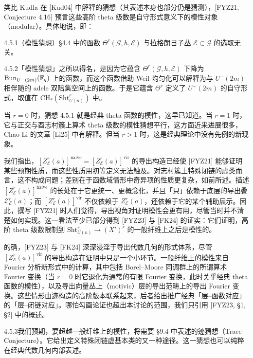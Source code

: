 类比 Kudla 在 [Kud04] 中解释的猜想（其表述本身也部分仍是猜测），[FYZ21, Conjecture 4.16] 预言这些高阶 theta 级数是自守形式意义下的模性对象（modular）。具体地说，即：

\begin{conj}{4.5.1}\label{thm:a6-03-2}（模性猜想）§4.4 中的函数 $\Theta^r(\mathcal G,h,\mathcal E)$ 与拉格朗日子丛 $\mathcal E\subset\mathcal G$ 的选取无关。
\end{conj}

\begin{rem}{4.5.2}\label{thm:a6-03-3}「模性猜想」之所以得名，是因为它蕴含 $\Theta^r(\mathcal G,h,\mathcal E)$ 下降为 $\mathrm{Bun}_{U^-(2m)}(\mathbb{F}_q)$ 上的函数，而这个函数借助 Weil 均匀化可以解释为与 $U^-(2m)$ 相伴随的 adele 双陪集空间上的函数。于是它蕴含 $\Theta^r$ 定义了 $U^-(2m)$ 的自守形式，取值在 $\mathrm{CH}_*(\mathrm{Sht}^r_{U(n)})$ 中。
\end{rem}

当 $r=0$ 时，猜想 4.5.1 就是经典 theta 函数的模性，这早已知道。当 $r=1$ 时，它与正交与酉志村簇上算术 theta 级数的模性猜想平行，这方面近来进展很多，Chao Li 的文章 [Li25] 中有解释。但当 $r>1$ 时，这是经典理论中没有先例的新现象。

我们指出，$[Z^r_{\mathcal E}(a)]^{\mathrm{naive}}=[Z^r_{\mathcal E}(a)]^{\mathrm{vir}}$ 的导出构造已经使 [FYZ21] 能够证明某些预期性质，而这些性质用初等定义无法触及。对志村簇上特殊闭链的虚类而言，这不构成问题；差别在于函数域情形中奇异项的性质更复杂，如前所述。描述 $[Z^r_{\mathcal E}(a)]^{\mathrm{naive}}$ 的长处在于它更统一、更概念化，并且「只」依赖于底层的导出叠 $\mathcal Z^r_{\mathcal E}(a)$；而 $[Z^r_{\mathcal E}(a)]^{\mathrm{vir}}$ 不仅依赖于 $Z^r_{\mathcal E}(a)$，还依赖于它的某个辅助展示。因此，撰写 [FYZ21] 时人们觉得，导出视角对证明模性会更有用，尽管当时并不清楚如何实现。这一看法至少已部分得到 [FYZ23] 与 [FK24] 的证实：它们证明，高阶 theta 级数限制到 $\mathrm{Sht}^r_{U(n)}\to(X')^r$ 的一般纤维上之后是模性的。

的确，[FYZ23] 与 [FK24] 深深浸淫于导出代数几何的形式体系，尽管 $[Z^r_{\mathcal E}(a)]^{\mathrm{vir}}$ 的导出构造在证明中只是一个小环节。一般纤维上的模性来自 Fourier 分析新形式中的计算，其中包括 Borel--Moore 同调群上的所谓算术 Fourier 变换（当 $r=0$ 时它退化为通常的有限 Fourier 变换，此时关乎经典 theta 函数的模性），以及导出向量丛上（motivic）层的导出范畴上的导出 Fourier 变换。这些情形由迹构造的高阶版本联系起来，后者给出推广经典「层--函数对应」的「层--闭链对应」。哪怕勾画论证也超出本讨论的范围，我们只引用 [FYZ23, §1, §2] 中的概述。

\begin{rem}{4.5.3}\label{thm:a6-03-4}我们预期，要超越一般纤维上的模性，将需要 §9.4 中表述的迹猜想（Trace Conjecture）。它给出定义特殊闭链虚基本类的又一种途径。这一猜想也可以纯粹在经典代数几何内部表述。
\end{rem}

